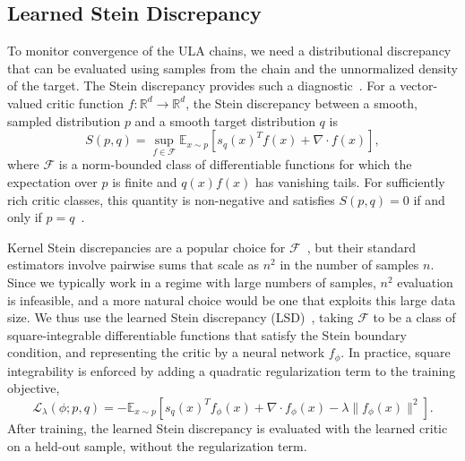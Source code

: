 \documentclass{article}
\begin{document}
\subsection{Learned Stein Discrepancy}
To monitor convergence of the ULA chains, we need a distributional discrepancy that can be evaluated using samples from the chain and the unnormalized density of the target.
The Stein discrepancy provides such a diagnostic~\cite{gorham2015measuring,anastasiou2023stein}.
For a vector-valued critic function $f:\mathbb{R}^d\to\mathbb{R}^d$, the Stein discrepancy between a smooth, sampled distribution $p$ and a smooth target distribution $q$ is
\begin{equation} \label{stein_discrepancy}
  S(p,q) = \sup_{f \in \mathcal{F}} \mathbb{E}_{x\sim p} \left[s_q(x)^T f(x) + \nabla \cdot f(x)\right],
\end{equation}
where $\mathcal{F}$ is a norm-bounded class of differentiable functions for which the expectation over $p$ is finite and $q(x) f(x)$ has vanishing tails.
For sufficiently rich critic classes, this quantity is non-negative and satisfies $S(p,q)=0$ if and only if $p=q$~\cite{stein2004use}.

Kernel Stein discrepancies are a popular choice for $\mathcal{F}$~\cite{liu2016kernelized,chwialkowski2016kernel,gorham2017measuring}, but their standard estimators involve pairwise sums that scale as $n^2$ in the number of samples $n$.
Since we typically work in a regime with large numbers of samples, $n^2$ evaluation is infeasible, and a more natural choice would be one that exploits this large data size.
We thus use the learned Stein discrepancy (LSD)~\cite{hu2018stein,grathwohl2020learning}, taking $\mathcal{F}$ to be a class of square-integrable differentiable functions that satisfy the Stein boundary condition, and representing the critic by a neural network $f_\phi$.
In practice, square integrability is enforced by adding a quadratic regularization term to the training objective,
\begin{equation} \label{LSD}
  \mathcal{L}_\lambda(\phi; p,q) = - \mathbb{E}_{x\sim p} \left[s_q(x)^T f_\phi(x) + \nabla \cdot f_\phi(x) - \lambda \lVert f_\phi(x) \rVert^2 \right].
\end{equation}
After training, the learned Stein discrepancy is evaluated with the learned critic on a held-out sample, without the regularization term.
\end{document}
